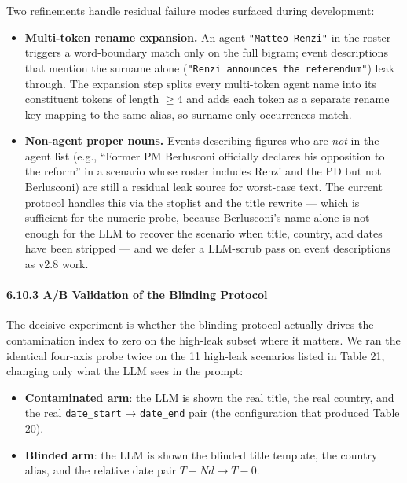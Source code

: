\documentclass[
]{article}
\providecommand{\tightlist}{%
  \setlength{\itemsep}{0pt}\setlength{\parskip}{0pt}}
\begin{document}
Two refinements handle residual failure modes surfaced during
development:

\begin{itemize}
\tightlist
\item
  \textbf{Multi-token rename expansion.} An agent
  \texttt{"Matteo\ Renzi"} in the roster triggers a word-boundary match
  only on the full bigram; event descriptions that mention the surname
  alone (\texttt{"Renzi\ announces\ the\ referendum"}) leak through. The
  expansion step splits every multi-token agent name into its
  constituent tokens of length \(\geq 4\) and adds each token as a
  separate rename key mapping to the same alias, so surname-only
  occurrences match.
\item
  \textbf{Non-agent proper nouns.} Events describing figures who are
  \emph{not} in the agent list (e.g., ``Former PM Berlusconi officially
  declares his opposition to the reform'' in a scenario whose roster
  includes Renzi and the PD but not Berlusconi) are still a residual
  leak source for worst-case text. The current protocol handles this via
  the stoplist and the title rewrite --- which is sufficient for the
  numeric probe, because Berlusconi's name alone is not enough for the
  LLM to recover the scenario when title, country, and dates have been
  stripped --- and we defer a LLM-scrub pass on event descriptions as
  v2.8 work.
\end{itemize}

\paragraph{6.10.3 A/B Validation of the Blinding
Protocol}\label{ab-validation-of-the-blinding-protocol}

The decisive experiment is whether the blinding protocol actually drives
the contamination index to zero on the high-leak subset where it
matters. We ran the identical four-axis probe twice on the 11 high-leak
scenarios listed in Table 21, changing only what the LLM sees in the
prompt:

\begin{itemize}
\tightlist
\item
  \textbf{Contaminated arm}: the LLM is shown the real title, the real
  country, and the real \texttt{date\_start} → \texttt{date\_end} pair
  (the configuration that produced Table 20).
\item
  \textbf{Blinded arm}: the LLM is shown the blinded title template, the
  country alias, and the relative date pair \(T - Nd \to T - 0\).
\end{itemize}
\end{document}
